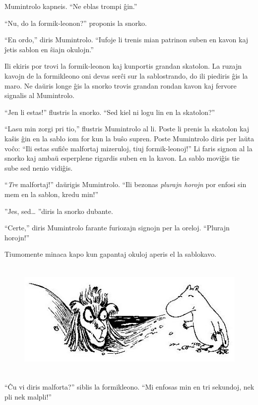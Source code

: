 Mumintrolo kapneis. ``Ne eblas trompi ĝin.''

``Nu, do la formik-leonon?'' proponis la snorko.

``En ordo,'' diris Mumintrolo. ``Iufoje li trenis mian patrinon suben en kavon kaj ĵetis sablon en ŝiajn okulojn.''

Ili ekiris por trovi la formik-leonon kaj kunportis grandan skatolon. La ruzajn kavojn de la formikleono oni devas serĉi sur la sablostrando, do ili piediris ĝis la maro. Ne daŭris longe ĝis la snorko trovis grandan rondan kavon kaj fervore signalis al Mumintrolo.

``Jen li estas!'' flustris la snorko. ``Sed kiel ni logu lin en la skatolon?''

``Lasu min zorgi pri tio,'' flustris Mumintrolo al li. Poste li prenis la skatolon kaj kaŝis ĝin en la sablo iom for kun la buŝo supren. Poste Mumintrolo diris per laŭta voĉo: ``Ili estas sufiĉe malfortaj mizeruloj, tiuj formik-leonoj!'' Li faris signon al la snorko kaj ambaŭ esperplene rigardis suben en la kavon. La sablo moviĝis tie sube sed nenio vidiĝis.

``\emph{Tre} malfortaj!'' daŭrigis Mumintrolo. ``Ili bezonas \emph{plurajn horojn} por enfosi sin mem en la sablon, kredu min!''

''Jes, sed{\ldots} ''diris la snorko dubante.

``Certe,'' diris Mumintrolo farante furiozajn signojn per la oreloj. ``Plurajn horojn!''

Tiumomente minaca kapo kun gapantaj okuloj aperis el la sablokavo.

\begin{figure}[htbp]
\centering
\includegraphics[width=400pt,height=161pt]{_9.jpg}
\caption{}
\label{_9}
\end{figure}

``Ĉu vi diris malforta?'' siblis la formikleono. ``Mi enfosas min en tri sekundoj, nek pli nek malpli!''

